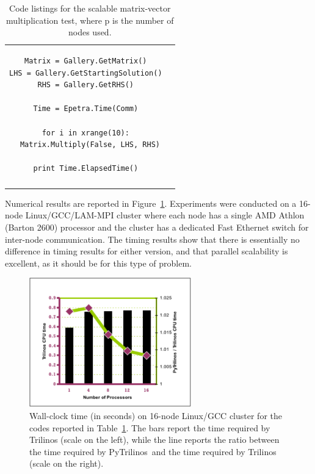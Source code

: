 \documentclass[acmtocl]{acmtrans2m}
\newcommand{\PyTrilinos}{{PyTrilinos}}
\begin{document}
\begin{table}
\begin{tabular}{| c  | c|}
\begin{minipage}{8.5cm}
\begin{verbatim}
Matrix = Gallery.GetMatrix()
LHS = Gallery.GetStartingSolution()
RHS = Gallery.GetRHS()

Time = Epetra.Time(Comm)

for i in xrange(10):
  Matrix.Multiply(False, LHS, RHS)

print Time.ElapsedTime()
\end{verbatim}
    \end{minipage}
    \\
    &  \\
    \hline
  \end{tabular}
  \caption{Code listings for the scalable matrix-vector multiplication
    test, where p is the number of nodes used.}
  \label{tab:code_parallel_matvec}
\end{table}

Numerical results are reported in
Figure~\ref{fig:time_parallel_matvec}.  Experiments were conducted on
a 16-node Linux/GCC/LAM-MPI cluster where each node has a single AMD
Athlon (Barton 2600) processor and the cluster has a dedicated Fast
Ethernet switch for inter-node communication.  The timing results show
that there is essentially no difference in timing results for either
version, and that parallel scalability is excellent, as it should be
for this type of problem.

\begin{figure}
  \begin{center}
    \includegraphics[width=7cm]{scalability-1k}
    \caption{Wall-clock time (in seconds) on 16-node Linux/GCC cluster
      for the codes reported in Table~\ref{tab:code_parallel_matvec}.
      The bars report the time required by Trilinos (scale on the
      left), while the line reports the ratio between the time
      required by \PyTrilinos\ and the time required by Trilinos (scale
      on the right).}
    \label{fig:time_parallel_matvec}
  \end{center}
\end{figure}
%
\end{document}
